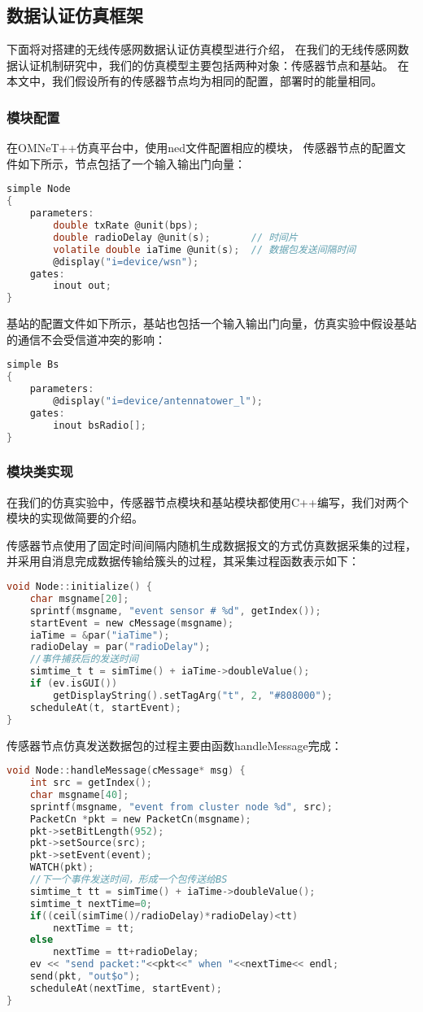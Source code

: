 \subsection{数据认证仿真框架}
下面将对搭建的无线传感网数据认证仿真模型进行介绍，
在我们的无线传感网数据认证机制研究中，我们的仿真模型主要包括两种对象：传感器节点和基站。
在本文中，我们假设所有的传感器节点均为相同的配置，部署时的能量相同。

\subsubsection{模块配置}
在OMNeT++仿真平台中，使用ned文件配置相应的模块，
传感器节点的配置文件如下所示，节点包括了一个输入输出门向量：
\begin{lstlisting}[language=C]
simple Node
{
    parameters:
        double txRate @unit(bps);
        double radioDelay @unit(s);       // 时间片
        volatile double iaTime @unit(s);  // 数据包发送间隔时间
        @display("i=device/wsn");
    gates:
        inout out;
}
\end{lstlisting}
基站的配置文件如下所示，基站也包括一个输入输出门向量，仿真实验中假设基站的通信不会受信道冲突的影响：
\begin{lstlisting}[language=C]
simple Bs
{
    parameters:
        @display("i=device/antennatower_l");
    gates:
        inout bsRadio[];
}
\end{lstlisting}
\subsubsection{模块类实现}
在我们的仿真实验中，传感器节点模块和基站模块都使用C++编写，我们对两个模块的实现做简要的介绍。

传感器节点使用了固定时间间隔内随机生成数据报文的方式仿真数据采集的过程，并采用自消息完成数据传输给簇头的过程，其采集过程函数表示如下：
\begin{lstlisting}[language=C]
void Node::initialize() {
    char msgname[20];
    sprintf(msgname, "event sensor # %d", getIndex());
    startEvent = new cMessage(msgname);
    iaTime = &par("iaTime");
    radioDelay = par("radioDelay");
    //事件捕获后的发送时间
    simtime_t t = simTime() + iaTime->doubleValue();
    if (ev.isGUI())
        getDisplayString().setTagArg("t", 2, "#808000");
    scheduleAt(t, startEvent);
}
\end{lstlisting}

传感器节点仿真发送数据包的过程主要由函数handleMessage完成：
\begin{lstlisting}[language=C]
void Node::handleMessage(cMessage* msg) {
    int src = getIndex();
    char msgname[40];
    sprintf(msgname, "event from cluster node %d", src);
    PacketCn *pkt = new PacketCn(msgname);
    pkt->setBitLength(952);
    pkt->setSource(src);
    pkt->setEvent(event);
    WATCH(pkt);
    //下一个事件发送时间，形成一个包传送给BS
    simtime_t tt = simTime() + iaTime->doubleValue();
    simtime_t nextTime=0;
    if((ceil(simTime()/radioDelay)*radioDelay)<tt)
        nextTime = tt;
    else
        nextTime = tt+radioDelay;
    ev << "send packet:"<<pkt<<" when "<<nextTime<< endl;
    send(pkt, "out$o");
    scheduleAt(nextTime, startEvent);
}
\end{lstlisting}

